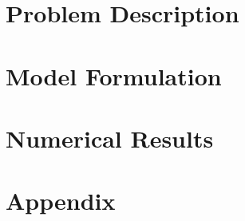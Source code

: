 \documentclass[10pt, conference, compsocconf]{IEEEtran}
\theoremstyle{definition}
\newcommand{\1}{1{\hskip -2.55 pt}\hbox{I}}
\begin{document}
\newlength\figureheight
\newlength\figurewidth
\title{}
\author{}

\maketitle

\begin{abstract}


\end{abstract}


\begin{IEEEkeywords}

\end{IEEEkeywords}
\IEEEpeerreviewmaketitle
\printnomenclature
%

\section{Problem Description}\label{sec:pd}

\section{Model Formulation}\label{sec:Model}

%
\section{Numerical Results}\label{sec:Results}

%
\section{Appendix}\label{sec:Appendix}





\clearpage
 
 
\end{document}
